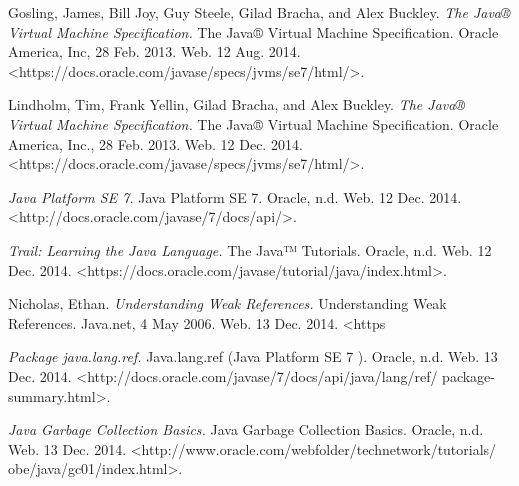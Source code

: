 \documentclass[fleqn,10pt]{SelfArx} %
\begin{document}
\begin{thebibliography}{9}

   Gosling, James, Bill Joy, Guy Steele, Gilad Bracha, and Alex Buckley. \textit{The Java® Virtual Machine Specification.} The Java® Virtual Machine Specification. Oracle America, Inc, 28 Feb. 2013. Web. 12 Aug. 2014. <https://docs.oracle.com/javase/specs/jvms/se7/html/>.

Lindholm, Tim, Frank Yellin, Gilad Bracha, and Alex Buckley. \textit{The Java® Virtual Machine Specification.} The Java® Virtual Machine Specification. Oracle America, Inc., 28 Feb. 2013. Web. 12 Dec. 2014. <https://docs.oracle.com/javase/specs/jvms/se7/html/>.

\textit{Java Platform SE 7.} Java Platform SE 7. Oracle, n.d. Web. 12 Dec. 2014. <http://docs.oracle.com/javase/7/docs/api/>.

\textit{Trail: Learning the Java Language.} The Java™ Tutorials. Oracle, n.d. Web. 12 Dec. 2014. <https://docs.oracle.com/javase/tutorial/java/index.html>.

Nicholas, Ethan. \textit{Understanding Weak References.} Understanding Weak References. Java.net, 4 May 2006. Web. 13 Dec. 2014. <https%

\textit{Package java.lang.ref.} Java.lang.ref (Java Platform SE 7 ). Oracle, n.d. Web. 13 Dec. 2014. <http://docs.oracle.com/javase/7/docs/api/java/lang/ref/ package-summary.html>.

\textit{Java Garbage Collection Basics.} Java Garbage Collection Basics. Oracle, n.d. Web. 13 Dec. 2014. <http://www.oracle.com/webfolder/technetwork/tutorials/ obe/java/gc01/index.html>.




\end{thebibliography}





\end{document}
